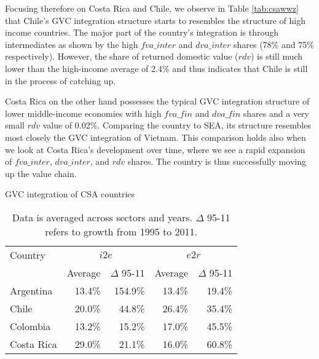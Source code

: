 \documentclass[11pt,a4paper]{article}
\begin{document}
Focusing therefore on Costa Rica and Chile, we observe in Table \ref{tab:csawwz} that Chile's GVC integration structure starts to resembles the structure of high income countries. The major part of the country's integration is through intermediates as shown by the high $fva\_inter$ and $dva\_inter$ shares (78\% and 75\% respectively). However, the share of returned domestic value ($rdv$) is still much lower than the high-income average of 2.4\% and thus indicates that Chile is still in the process of catching up.

Costa Rica on the other hand possesses the typical GVC integration structure of lower middle-income economies with high $fva\_fin$ and $dva\_fin$ shares and a very small $rdv$ value of 0.02\%. Comparing the country to SEA, its structure resembles most closely the GVC integration of Vietnam. This comparison holds also when we look at Costa Rica's development over time, where we see a rapid expansion of $fva\_inter$, $dva\_inter$, and $rdv$ shares. The country is thus successfully moving up the value chain.

\begin{table}[htbp]\small
  \centering
  \caption{GVC integration of CSA countries}
    \begin{tabular}{lrrrr}
    \toprule
    Country & \multicolumn{2}{c}{\multirow{1}[0]{*}{$i2e$}} & \multicolumn{2}{c}{\multirow{1}[0]{*}{$e2r$}} \\
    \multicolumn{1}{c}{} & \multicolumn{1}{c}{Average} & \multicolumn{1}{c}{$\Delta$ 95-11} & \multicolumn{1}{c}{Average} & \multicolumn{1}{c}{$\Delta$ 95-11} \\
    \midrule
    Argentina & 13.4\% & 154.9\% & 13.4\% & 19.4\% \\
    Chile & 20.0\% & 44.8\% & 26.4\% & 35.4\% \\
    Colombia & 13.2\% & 15.2\% & 17.0\% & 45.5\% \\
    Costa Rica & 29.0\% & 21.1\% & 16.0\% & 60.8\% \\
    \bottomrule
\end{tabular}
  \label{tab:csagvc}
     \caption*{Data is averaged across sectors and years. $\Delta$ 95-11 refers to growth from 1995 to 2011.}

\end{table}
\end{document}
